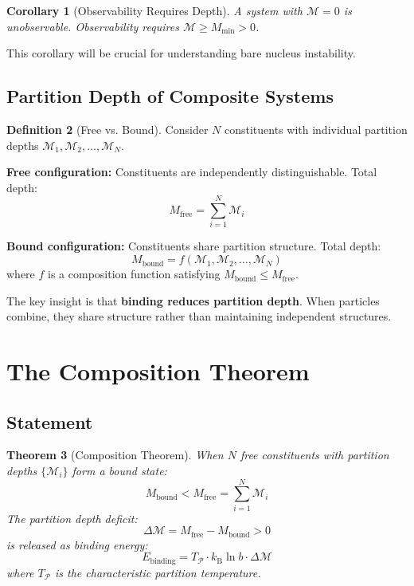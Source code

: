 \documentclass[twocolumn,10pt,a4paper]{article}
\newtheorem{theorem}{Theorem}[section]
\newtheorem{corollary}[theorem]{Corollary}
\theoremstyle{definition}
\newtheorem{definition}[theorem]{Definition}
\theoremstyle{remark}
\newcommand{\kB}{k_{\mathrm{B}}}
\newcommand{\Partition}{\mathcal{P}}
\newcommand{\Depth}{\mathcal{M}}
\newcommand{\Mfree}{M_{\mathrm{free}}}
\newcommand{\Mbound}{M_{\mathrm{bound}}}
\newcommand{\Mmin}{M_{\mathrm{min}}}
\begin{document}
\begin{corollary}[Observability Requires Depth]
\label{cor:observability}
A system with $\Depth = 0$ is unobservable. Observability requires $\Depth \geq \Mmin > 0$.
\end{corollary}

This corollary will be crucial for understanding bare nucleus instability.

\subsection{Partition Depth of Composite Systems}

\begin{definition}[Free vs. Bound]
\label{def:free_bound}
Consider $N$ constituents with individual partition depths $\Depth_1, \Depth_2, \ldots, \Depth_N$.

\textbf{Free configuration:} Constituents are independently distinguishable. Total depth:
\begin{equation}
    \Mfree = \sum_{i=1}^{N} \Depth_i
\end{equation}

\textbf{Bound configuration:} Constituents share partition structure. Total depth:
\begin{equation}
    \Mbound = f(\Depth_1, \Depth_2, \ldots, \Depth_N)
\end{equation}
where $f$ is a composition function satisfying $\Mbound \leq \Mfree$.
\end{definition}

The key insight is that \textbf{binding reduces partition depth}. When particles combine, they share structure rather than maintaining independent structures.

\section{The Composition Theorem}
\label{sec:composition}

\subsection{Statement}

\begin{theorem}[Composition Theorem]
\label{thm:composition}
When $N$ free constituents with partition depths $\{\Depth_i\}$ form a bound state:
\begin{equation}
    \Mbound < \Mfree = \sum_{i=1}^{N} \Depth_i
\end{equation}
The partition depth deficit:
\begin{equation}
    \Delta\Depth = \Mfree - \Mbound > 0
\end{equation}
is released as binding energy:
\begin{equation}
    E_{\text{binding}} = T_{\Partition} \cdot \kB \ln b \cdot \Delta\Depth
\end{equation}
where $T_{\Partition}$ is the characteristic partition temperature.
\end{theorem}
\end{document}
